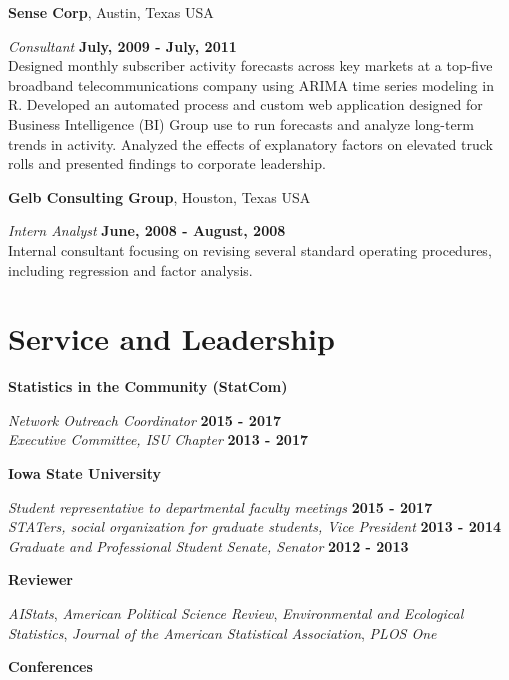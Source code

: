 \documentclass[margin,line]{res}
\begin{document}
\begin{resume}
{\bf Sense Corp}, Austin, Texas USA

\vspace{-.3cm}
{\em Consultant} \hfill {\bf July, 2009 - July, 2011}\\
Designed monthly subscriber activity forecasts across key markets at a top-five broadband telecommunications company using ARIMA time series modeling in R. Developed an automated process and custom web application designed for Business Intelligence (BI) Group use to run forecasts and analyze long-term trends in activity. Analyzed the effects of explanatory factors on elevated truck rolls and presented findings to corporate leadership.

{\bf Gelb Consulting Group}, Houston, Texas USA

\vspace{-.3cm}
{\em Intern Analyst} \hfill {\bf  June, 2008 - August, 2008}\\
Internal consultant focusing on revising several standard operating procedures, including regression and factor analysis. 

\section{\sc Service and Leadership}

{\bf Statistics in the Community (StatCom)}

\vspace{-.3cm}
{\em Network Outreach Coordinator} \hfill {\bf 2015 - 2017}\\
{\em Executive Committee, ISU Chapter} \hfill {\bf 2013 - 2017}

{\bf Iowa State University}

\vspace{-.3cm}
{\em Student representative to departmental faculty meetings} \hfill {\bf 2015 - 2017}\\
{\em STATers, social organization for graduate students, Vice President} \hfill {\bf 2013 - 2014}\\
{\em Graduate and Professional Student Senate, Senator} \hfill {\bf 2012 - 2013}


{\bf Reviewer}

\vspace{-.3cm}
{\em AIStats}, {\em American Political Science Review}, {\em Environmental and Ecological Statistics}, {\em Journal of the American Statistical Association}, {\em PLOS One}


{\bf Conferences}


\end{resume}
\end{document}
